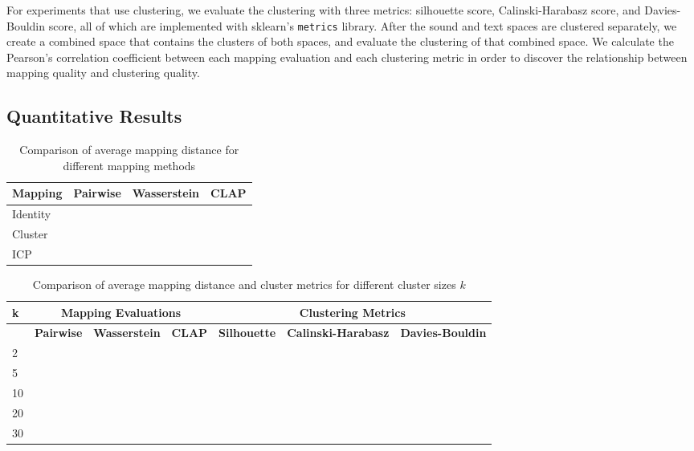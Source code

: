 \documentclass[twoside,a4paper]{article}
\begin{document}
For experiments that use clustering, we evaluate the clustering with three metrics: silhouette score, Calinski-Harabasz score, and Davies-Bouldin score, all of which are implemented with sklearn's \texttt{metrics} library. After the sound and text spaces are clustered separately, we create a combined space that contains the clusters of both spaces, and evaluate the clustering of that combined space. We calculate the Pearson's correlation coefficient between each mapping evaluation and each clustering metric in order to discover the relationship between mapping quality and clustering quality.

\subsection{Quantitative Results}

\begin{table}[h]
    \centering
    \begin{tabular}{|l|c|c|c|}
        \hline
        \textbf{Mapping} & \textbf{Pairwise} & \textbf{Wasserstein} & \textbf{CLAP} \\
        \hline
        Identity & & & \\
        \hline
        Cluster & & & \\
        \hline
        ICP & & & \\
        \hline
    \end{tabular}
    \caption{Comparison of average mapping distance for different mapping methods}
    \label{tab:res:avg-dist}
\end{table}

\begin{table}[h]
    \centering
    \begin{tabular}{|l|ccc|ccc|}
        \hline
        \textbf{k} & \multicolumn{3}{c|}{\textbf{Mapping Evaluations}} & \multicolumn{3}{c|}{\textbf{Clustering Metrics}} \\
        \hline
        & \textbf{Pairwise} & \textbf{Wasserstein} & \textbf{CLAP} & \textbf{Silhouette} & \textbf{Calinski-Harabasz} & \textbf{Davies-Bouldin} \\
        \hline
        2  & & & & & & \\
        \hline
        5  & & & & & & \\
        \hline
        10 & & & & & & \\
        \hline
        20 & & & & & & \\
        \hline
        30 & & & & & & \\
        \hline
    \end{tabular}
    \caption{Comparison of average mapping distance and cluster metrics for different cluster sizes $k$}
    \label{tab:res:k}
\end{table}
\end{document}
